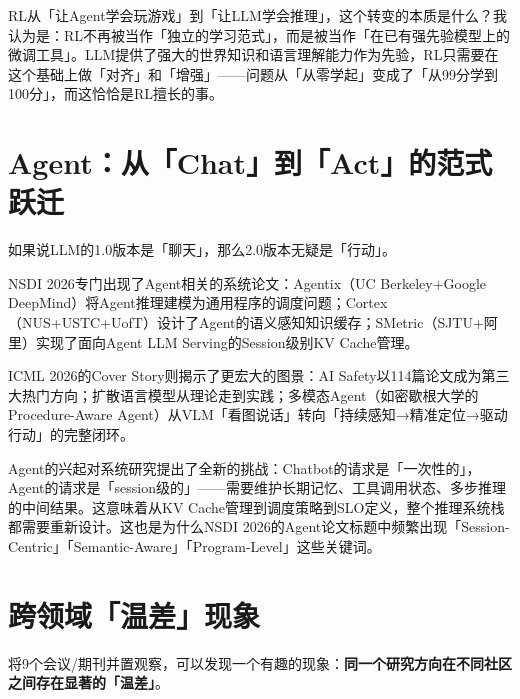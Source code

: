\documentclass[12pt,a4paper]{ctexart}
\begin{document}
\begin{thinkbox}
RL从「让Agent学会玩游戏」到「让LLM学会推理」，这个转变的本质是什么？我认为是：RL不再被当作「独立的学习范式」，而是被当作「在已有强先验模型上的微调工具」。LLM提供了强大的世界知识和语言理解能力作为先验，RL只需要在这个基础上做「对齐」和「增强」——问题从「从零学起」变成了「从99分学到100分」，而这恰恰是RL擅长的事。
\end{thinkbox}

\section{Agent：从「Chat」到「Act」的范式跃迁}

如果说LLM的1.0版本是「聊天」，那么2.0版本无疑是「行动」。

NSDI 2026专门出现了Agent相关的系统论文：Agentix（UC Berkeley+Google DeepMind）将Agent推理建模为通用程序的调度问题；Cortex（NUS+USTC+UofT）设计了Agent的语义感知知识缓存；SMetric（SJTU+阿里）实现了面向Agent LLM Serving的Session级别KV Cache管理。

ICML 2026的Cover Story则揭示了更宏大的图景：AI Safety以114篇论文成为第三大热门方向；扩散语言模型从理论走到实践；多模态Agent（如密歇根大学的Procedure-Aware Agent）从VLM「看图说话」转向「持续感知→精准定位→驱动行动」的完整闭环。

\begin{thinkbox}
Agent的兴起对系统研究提出了全新的挑战：Chatbot的请求是「一次性的」，Agent的请求是「session级的」——需要维护长期记忆、工具调用状态、多步推理的中间结果。这意味着从KV Cache管理到调度策略到SLO定义，整个推理系统栈都需要重新设计。这也是为什么NSDI 2026的Agent论文标题中频繁出现「Session-Centric」「Semantic-Aware」「Program-Level」这些关键词。
\end{thinkbox}

\section{跨领域「温差」现象}

将9个会议/期刊并置观察，可以发现一个有趣的现象：\textbf{同一个研究方向在不同社区之间存在显著的「温差」}。
\end{document}
